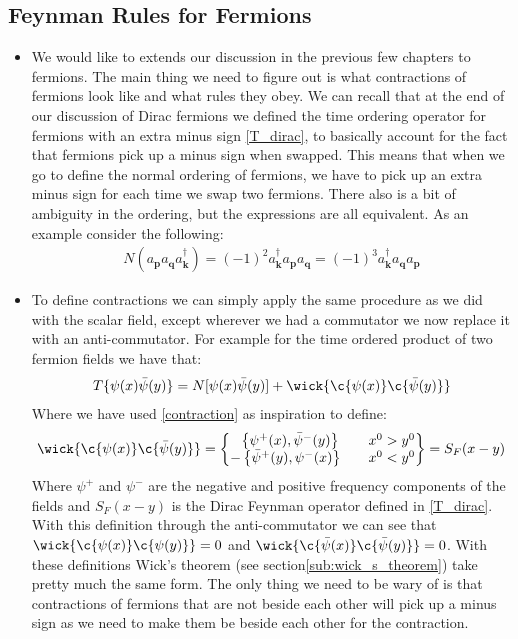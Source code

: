 \documentclass[11pt]{article}
\numberwithin{equation}{section}
\begin{document}
\subsection{Feynman Rules for Fermions} %
\label{sub:feynman_rules_for_fermions}
\begin{itemize}
  \item We would like to extends our discussion in the previous few chapters to fermions. The main thing we need to figure out is what contractions of fermions look like and what rules they obey. We can recall that at the end of our discussion of Dirac fermions we defined the time ordering operator for fermions with an extra minus sign \ref{T_dirac}, to basically account for the fact that fermions pick up a minus sign when swapped. This means that when we go to define the normal ordering of fermions, we have to pick up an extra minus sign for each time we swap two fermions. There also is a bit of ambiguity in the ordering, but the expressions are all equivalent. As an example consider the following:
  \begin{align*}
    N(a_{\textbf{p}}a_{\textbf{q}}a^{\dagger}_{\textbf{k}}) = (-1)^2a^{\dagger}_{\textbf{k}}a_{\textbf{p}}a_{\textbf{q}} = (-1)^3a^{\dagger}_{\textbf{k}}a_{\textbf{q}}a_{\textbf{p}}
  \end{align*}
  \item To define contractions we can simply apply the same procedure as we did with the scalar field, except wherever we had a commutator we now replace it with an anti-commutator. For example for the time ordered product of two fermion fields we have that:
  \begin{align*}
    T\{\psi(x)\bar{\psi}(y)\} = N[\psi(x)\bar{\psi}(y)] + \wick{\c{\psi(x)} \c{\bar{\psi}(y)}}
  \end{align*}
  Where we have used \ref{contraction} as inspiration to define:
  \begin{align*}
    \wick{\c{\psi(x)} \c{\bar{\psi}(y)}}= \left\{\begin{matrix}
         ~~\left\{\psi^+(x),\bar{\psi}^-(y)\right\}& ~~~x^0>y^0 \\
         -\left\{\bar{\psi}^+(y),\psi^-(x)\right\}& ~~~x^0<y^0 
         \end{matrix}\right\} = S_{F}(x-y)
  \end{align*}
  Where $\psi^+$ and $\psi^-$ are the negative and positive frequency components of the fields and $S_F(x-y)$ is the Dirac Feynman operator defined in \ref{T_dirac}. With this definition through the anti-commutator we can see that $\wick{\c{\psi(x)} \c{\psi(y)}} = 0$ and $\wick{\c{\bar{\psi}(x)} \c{\bar{\psi}(y)}} =0$. With these definitions Wick's theorem (see section\ref{sub:wick_s_theorem}) take pretty much the same form. The only thing we need to be wary of is that contractions of fermions that are not beside each other will pick up a minus sign as we need to make them be beside each other for the contraction. 


\end{itemize}
\end{document}
